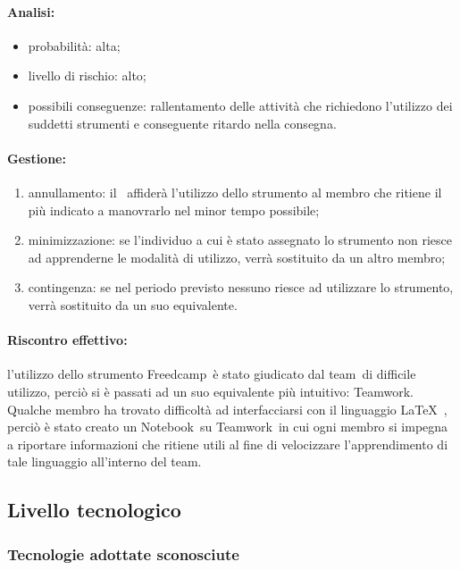 \documentclass[../PianoProgetto.tex]{subfiles}
\begin{document}
	\paragraph*{Analisi:}
	\begin{itemize}
		\item probabilità: alta;
		\item livello di rischio: alto;
		\item possibili conseguenze: rallentamento delle attività che richiedono l'utilizzo dei suddetti strumenti e conseguente ritardo nella consegna.
	\end{itemize}
	
	\paragraph*{Gestione:}
	\begin{enumerate}
		\item annullamento: il \responsabilediprogetto\ affiderà l'utilizzo dello strumento al membro che ritiene il più indicato a manovrarlo nel minor tempo possibile;
		\item minimizzazione: se l'individuo a cui è stato assegnato lo strumento non riesce ad apprenderne le modalità di utilizzo, verrà sostituito da un altro membro;
		\item contingenza: se nel periodo previsto nessuno riesce ad utilizzare lo strumento, verrà sostituito da un suo equivalente. 
	\end{enumerate}	
	
	\paragraph*{Riscontro effettivo:} l'utilizzo dello strumento Freedcamp\g\ è stato giudicato dal team\g\ di difficile utilizzo, perciò si è passati ad un suo equivalente più intuitivo: Teamwork\g .
	Qualche membro ha trovato difficoltà ad interfacciarsi con il linguaggio \LaTeX\  , perciò è stato creato un Notebook\g\ su Teamwork\g\ in cui ogni membro si impegna a riportare informazioni che ritiene utili al fine di velocizzare l'apprendimento di tale linguaggio all'interno del team\g .

\subsection{Livello tecnologico}

\subsubsection{Tecnologie adottate sconosciute}
\end{document}

